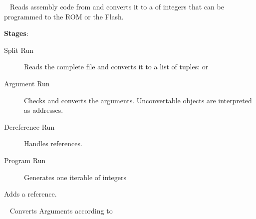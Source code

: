 \documentclass[letterpaper,10pt,english]{sphinxmanual}
\begin{document}

\begin{fulllineitems}
\label{tools:py_register_machine2.tools.assembler.assembler.Assembler}~\label{tools:assembler}
Reads assembly code from  and converts it to
a  of integers that can be programmed to the ROM or the Flash.

\textbf{Stages}:
\begin{description}
\item[{Split Run}] \leavevmode
Reads the complete file and converts it to a list of tuples:
 or

\item[{Argument Run}] \leavevmode
Checks and converts the arguments. Unconvertable  objects are
interpreted as addresses.

\item[{Dereference Run}] \leavevmode
Handles references.

\item[{Program Run}] \leavevmode
Generates one iterable of integers

\end{description}

\begin{fulllineitems}
\label{tools:py_register_machine2.tools.assembler.assembler.Assembler.add_ref}
Adds a reference.

\end{fulllineitems}


\begin{fulllineitems}
\label{tools:py_register_machine2.tools.assembler.assembler.Assembler.argument_run}~\label{tools:argument-run}
Converts Arguments according to 


\end{fulllineitems}
\end{fulllineitems}
\end{document}
